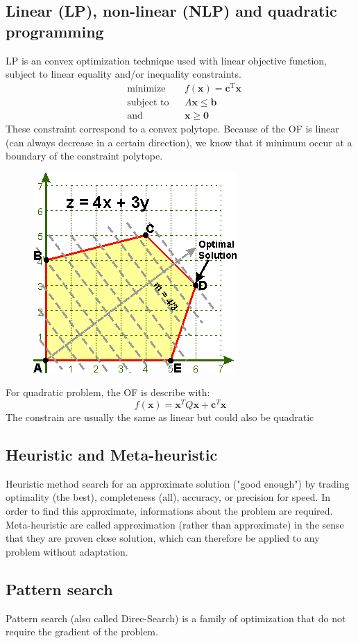 \documentclass[twocolumn]{article}
\numberwithin{equation}{section}
\begin{document}
	\subsection{Linear (LP), non-linear (NLP) and quadratic programming}
LP is an convex optimization technique used with linear objective function, subject to linear equality and/or inequality constraints. 
 \begin{align*}
& \text{minimize}   && f(\mathbf{x})=\mathbf{c}^\mathrm{T} \mathbf{x}\\
& \text{subject to} && A \mathbf{x} \leq \mathbf{b} \\
& \text{and} && \mathbf{x} \ge \mathbf{0}
\end{align*} 
These constraint correspond to a convex polytope. Because of the OF is linear (can always decrease in a certain direction), we know that it minimum occur at a boundary of the constraint polytope.
\begin{figure}[H]
	\centering
    \includegraphics[width=.20\textwidth]{linear.png}
\end{figure}

For quadratic problem, the OF is describe with:
$$ f(\mathbf{x})=\mathbf{x}^T Q\mathbf{x} + \mathbf{c}^T \mathbf{x}$$
The constrain are usually the same as linear but could also be quadratic



	\subsection{Heuristic and Meta-heuristic}
Heuristic method search for an approximate solution ("good enough") by trading optimality (the best), completeness (all), accuracy, or precision for speed. In order to find this approximate, informations about the problem are required. Meta-heuristic are called approximation (rather than approximate) in the sense that they are proven close solution, which can therefore be applied to any problem without adaptation.


	\subsection{Pattern search}
Pattern search (also called Direc-Search) is a family of optimization that do not require the gradient of the problem. 
\end{document}
